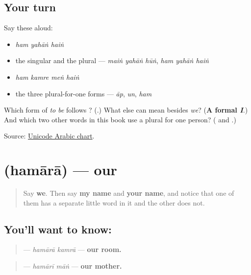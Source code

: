 \subsection*{Your turn}
Say these aloud:

\begin{itemize}
\raggedright
  \item \emph{ham yahāṅ haiṅ}
  \item the singular and the plural — \emph{maiṅ yahāṅ hūṅ}, \emph{ham yahāṅ haiṅ}
  \item \emph{ham kamre meṅ haiṅ}
  \item the three plural-for-one forms — \emph{āp}, \emph{un}, \emph{ham}
\end{itemize}

\begin{tcolorbox}[breakable,colback=teal!4,colframe=teal!35!black,title={Before you move on}]
Which form of \emph{to be} follows \textbf{}? (\textbf{}.) What else can \textbf{} mean besides \emph{we}? (\textbf{A formal \emph{I}}.) And which two other words in this book use a plural for one person? (\textbf{} and \textbf{}.)

Source: \href{https://www.unicode.org/charts/PDF/U0600.pdf}{Unicode Arabic chart}.
\end{tcolorbox}
\section[\texorpdfstring{\ur{ہمارا} (hamārā)}{ہمارا (hamārā)}]{ (hamārā) — our}

\label{lesson:UR-C25-hamara}



\begin{quote}
Say \textbf{we}. Then say \textbf{my name} and \textbf{your name}, and notice that one of them has a separate little word in it and the other does not.
\end{quote}

\subsection*{You'll want to know: }
\begin{quote}
\textbf{ } — \emph{hamārā kamrā} — \textbf{our room.}
\end{quote}

\begin{quote}
\textbf{ } — \emph{hamārī māṅ} — \textbf{our mother.}
\end{quote}

